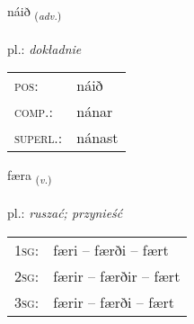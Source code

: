 \documentclass[frontgrid, backgrid]{flacards}\usepackage[]{graphicx}\usepackage[]{xcolor}
\begin{document}
\renewcommand{\blhead}{\vskip5pt {\small\bfseries\footnotesize Atviksorð | przysłówek }}
\renewcommand{\bcfoot}{\vskip5pt \hspace{2pt}{\small\bfseries\footnotesize 1K}}


{náið \small{\textsubscript{(\textit{adv.})}} \\[1ex] %
\textphonetic{[nauːɪð]} \\
pl.: \emph{dokładnie} \\  [2ex]
\renewcommand*{\arraystretch}{0.8}
\begin{tabular}{ll}
\textsc{pos}: & náið \\ 
\textsc{comp.}: & nánar \\ 
\textsc{superl.}: & nánast \\
\end{tabular}
}

\renewcommand{\flhead}{\vskip5pt \fboxsep=0pt {\small\bfseries\footnotesize Sagnorð | czasownik}}
\renewcommand{\fcfoot}{\vskip5pt \fboxsep=0pt \hspace{2pt}{\small\bfseries\footnotesize 1K}}

\renewcommand{\blhead}{\vskip5pt {\small\bfseries\footnotesize Sagnorð | czasownik }}
\renewcommand{\bcfoot}{\vskip5pt \hspace{2pt}{\small\bfseries\footnotesize 1K}}


{færa \small{\textsubscript{(\textit{v.})}} \\[1ex] %
\textphonetic{[faiːra]} \\
pl.: \emph{ruszać; przynieść} \\  [2ex]
\renewcommand*{\arraystretch}{0.8}
\begin{tabular}{p{1cm}l}
\textsc{1sg}: & færi -- færði -- fært \\ 
\textsc{2sg}: & færir -- færðir -- fært \\ 
\textsc{3sg}: & færir -- færði -- fært \\ 
\end{tabular}
}

\end{document}

